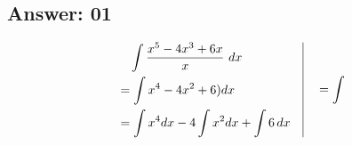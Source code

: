 \documentclass[17pt]{extarticle}
\begin{document}
\begin{fleqn}

\section{Answer: 01}

\begin{equation} \nonumber
\begin{alignedat}{4}
& \quad \int \frac{x^5 - 4x^3 + 6x}{x}\ dx\\
&= \int x^4 - 4x^2 +6)dx\\
&= \int x^4dx - 4\int x^2dx +\int 6\,dx\\
\end{alignedat}
\quad
\vrule
\quad
\begin{alignedat}{4}
&= \int \\
\end{alignedat}
\end{equation}
\quad


\end{fleqn}
\end{document}
